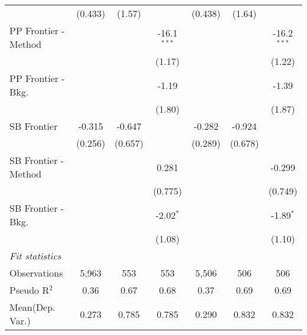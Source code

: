 \begin{tabular}{lcccccc}
                        & (0.433)      & (1.57)  &               & (0.438)      & (1.64)  &   \\   
   PP Frontier - Method &              &         & -16.1$^{***}$ &              &         & -16.2$^{***}$\\   
                        &              &         & (1.17)        &              &         & (1.22)\\   
   PP Frontier - Bkg.   &              &         & -1.19         &              &         & -1.39\\   
                        &              &         & (1.80)        &              &         & (1.87)\\   
   SB Frontier          & -0.315       & -0.647  &               & -0.282       & -0.924  &   \\   
                        & (0.256)      & (0.657) &               & (0.289)      & (0.678) &   \\   
   SB Frontier - Method &              &         & 0.281         &              &         & -0.299\\   
                        &              &         & (0.775)       &              &         & (0.749)\\   
   SB Frontier - Bkg.   &              &         & -2.02$^{*}$   &              &         & -1.89$^{*}$\\   
                        &              &         & (1.08)        &              &         & (1.10)\\   
   \midrule
   \emph{Fit statistics}\\
   Observations         & 5,963        & 553     & 553           & 5,506        & 506     & 506\\  
   Pseudo R$^2$         & 0.36         & 0.67    & 0.68          & 0.37         & 0.69    & 0.69\\  
Mean(Dep. Var.) & 0.273 & 0.785 & 0.785 & 0.290 & 0.832 & 0.832 \\
   

\end{tabular}
